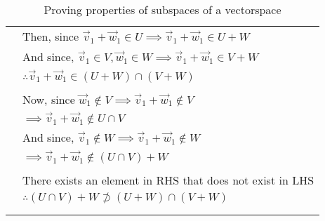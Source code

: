 \documentclass[journal,12pt]{IEEEtran}
\begin{document}
\begin{longtable}{|l|l|}
        & Then, since $\vec{v}_1 + \vec{w}_1 \in U \implies \vec{v}_1 + \vec{w}_1 \in U+W$\\
        & And since, $\vec{v}_1 \in V, \vec{w}_1 \in W \implies \vec{v}_1 + \vec{w}_1 \in V+W$\\
        & $\therefore \vec{v}_1 + \vec{w}_1 \in (U+W) \cap (V+W)$\\
        & \\
        & Now, since $\vec{w}_1 \not\in V \implies \vec{v}_1 + \vec{w}_1 \not\in V$\\
        & $\implies \vec{v}_1 + \vec{w}_1 \not\in U \cap V$\\
        & And since, $\vec{v}_1 \not\in W \implies \vec{v}_1 + \vec{w}_1 \not\in W$\\
        & $\implies \vec{v}_1 + \vec{w}_1 \not\in (U \cap V) + W$\\
        & \\
        & There exists an element in RHS that does not exist in LHS\\
        & $\therefore (U \cap V) + W \not\supset (U+W) \cap (V+W)$\\
        & \\
    \hline
    \caption{Proving properties of subspaces of a vectorspace}
    \label{tab:proof}
\end{longtable}
\end{document}
